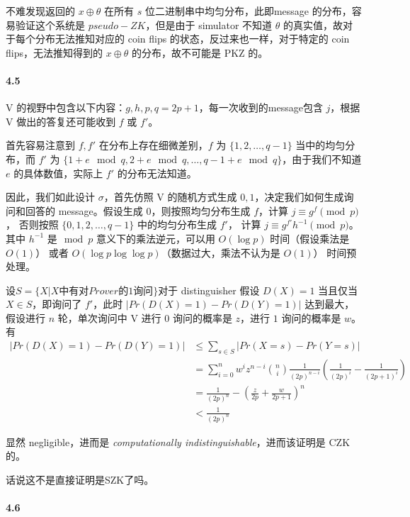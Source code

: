 \documentclass[12pt, a4paper, oneside]{ctexart}
\begin{document}
	不难发现返回的 $x\oplus \theta$ 在所有 $s$ 位二进制串中均匀分布，此即message 的分布，容易验证这个系统是 $pseudo-ZK$，但是由于 simulator 不知道 $\theta$ 的真实值，故对于每个分布无法推知对应的 coin flips 的状态，反过来也一样，对于特定的 coin flips，无法推知得到的 $x\oplus \theta$ 的分布，故不可能是 PKZ 的。
	
	\paragraph{4.5} 
	
	V 的视野中包含以下内容：$g,h,p,q=2p+1$，每一次收到的message包含 $j$，根据 V 做出的答复还可能收到 $f$ 或 $f'$。
	
	首先容易注意到 $f,f'$ 在分布上存在细微差别，$f$ 为 $\{1,2,\dots,q-1\}$ 当中的均匀分布，而 $f'$ 为 $\{1+e\mod q,2+e\mod q,\dots, q-1+e\mod q\}$，由于我们不知道 $e$ 的具体数值，实际上 $f'$ 的分布无法知道。
	
	因此，我们如此设计 $\sigma$，首先仿照 V 的随机方式生成 $0,1$，决定我们如何生成询问和回答的 message。假设生成 $0$，则按照均匀分布生成 $f$，计算 $j\equiv g^f\pmod p$，
	否则按照 $\{0,1,2,\dots,q-1\}$ 中的均匀分布生成 $f'$，
	计算 $j\equiv g^{f'}h^{-1} \pmod p$。
	其中 $h^{-1}$ 是$\mod p$ 意义下的乘法逆元，可以用 $O(\log p)$ 时间（假设乘法是 $O(1)$） 或者 $O(\log p\log\log p)$（数据过大，乘法不认为是 $O(1)$） 时间预处理。
	
	设$S=\{X|X \text{中有对}Prover \text{的} 1 \text{询问}\}$对于 distinguisher 假设 $D(X)=1$ 当且仅当 $X\in S$，即询问了 $f'$，此时 $|Pr(D(X)=1)-Pr(D(Y)=1)|$ 达到最大，假设进行 $n$ 轮，单次询问中 V 进行 $0$ 询问的概率是 $z$，进行 $1$ 询问的概率是 $w$。有 $$\begin{aligned}
		|Pr(D(X)=1)-Pr(D(Y)=1)|&\leq \sum_{s\in S}|Pr(X=s)-Pr(Y=s)|\\
		&=\sum_{i=0}^nw^iz^{n-i}{n\choose  i}\frac{1}{(2p)^{n-i}}(\frac{1}{(2p)^i}-\frac{1}{(2p+1)^i})\\
		&=\frac{1}{(2p)^n}-(\frac{z}{2p}+\frac{w}{2p+1})^n\\
		&<\frac{1}{(2p)^n}
	\end{aligned}$$
	
	显然 negligible，进而是 \textit{computationally indistinguishable}，进而该证明是 CZK的。
	
	话说这不是直接证明是SZK了吗。
		
	\paragraph{4.6}
	
\end{document}
